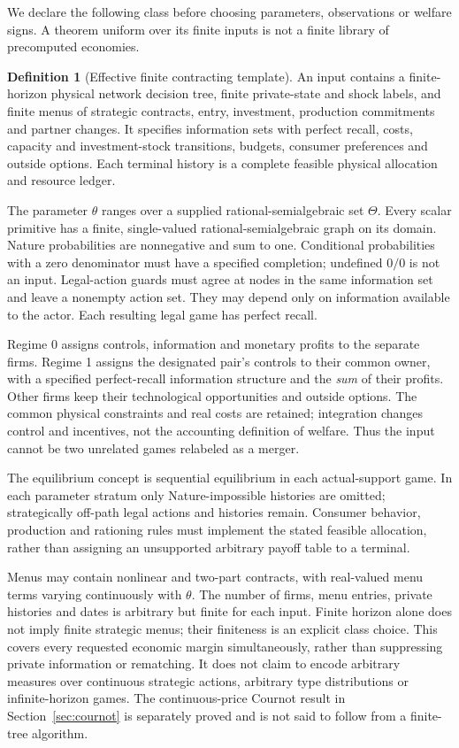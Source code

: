 \documentclass[11pt,a4paper]{article}
\numberwithin{equation}{section}
\theoremstyle{definition}
\newtheorem{definition}[theorem]{Definition}
\begin{document}
We declare the following class before choosing parameters, observations or
welfare signs. A theorem uniform over its finite inputs is not a finite
library of precomputed economies.

\begin{definition}[Effective finite contracting template]\label{def:class}
An input contains a finite-horizon physical network decision tree, finite
private-state and shock labels, and finite menus of strategic contracts,
entry, investment, production commitments and partner changes. It specifies
information sets with perfect recall, costs, capacity and investment-stock
transitions, budgets, consumer preferences and outside options. Each terminal
history is a complete feasible physical allocation and resource ledger.

The parameter $\theta$ ranges over a supplied rational-semialgebraic set
$\Theta$. Every scalar primitive has a finite, single-valued
rational-semialgebraic graph on its domain. Nature probabilities are
nonnegative and sum to one. Conditional probabilities with a zero denominator
must have a specified completion; undefined $0/0$ is not an input.
Legal-action guards must agree at nodes in the same information set and
leave a nonempty action set. They may depend only on information available
to the actor. Each resulting legal game has perfect recall.

Regime 0 assigns controls, information and monetary profits to the separate
firms. Regime 1 assigns the designated pair's controls to their common owner,
with a specified perfect-recall information structure and the \emph{sum}
of their profits. Other firms keep their technological opportunities and
outside options. The common physical constraints and real costs are retained;
integration changes control and incentives, not the accounting definition
of welfare. Thus the input cannot be two unrelated games relabeled as a merger.

The equilibrium concept is sequential equilibrium in each actual-support
game. In each parameter stratum only Nature-impossible histories are omitted;
strategically off-path legal actions and histories remain. Consumer behavior,
production and rationing rules must implement the stated feasible allocation,
rather than assigning an unsupported arbitrary payoff table to a terminal.
\end{definition}

Menus may contain nonlinear and two-part contracts, with real-valued menu
terms varying continuously with $\theta$. The number of firms, menu entries,
private histories and dates is arbitrary but finite for each input.
Finite horizon alone does not imply finite strategic menus; their finiteness
is an explicit class choice. This covers every requested economic margin
simultaneously, rather than suppressing private information or rematching.
It does not claim to encode arbitrary measures over continuous strategic
actions, arbitrary type distributions or infinite-horizon games. The
continuous-price Cournot result in Section~\ref{sec:cournot} is separately
proved and is not said to follow from a finite-tree algorithm.
\end{document}
